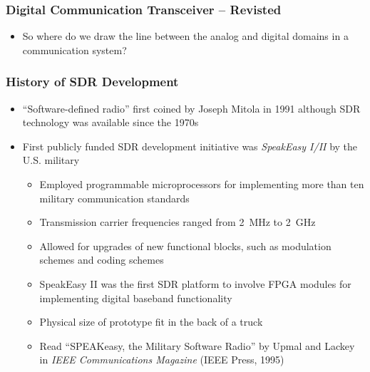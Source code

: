 \documentclass[10pt]{beamer}
\begin{document}


\frame
{
  \frametitle{Digital Communication Transceiver -- Revisted}

  \begin{itemize}
   \item So where do we draw the line between the analog and digital domains in a communication system?
  \end{itemize}

}


\frame
{
  \frametitle{History of SDR Development}
  \begin{itemize}
    \item  ``Software-defined radio'' first coined by Joseph Mitola in 1991 although SDR technology was available since the 1970s
    \item First publicly funded SDR development initiative was {\it SpeakEasy I/II} by the U.S. military
    \begin{itemize}
        \item Employed programmable microprocessors for implementing more than ten military communication standards
        \item Transmission carrier frequencies ranged from 2~MHz to 2~GHz
        \item Allowed for upgrades of new functional blocks, such as modulation schemes and coding schemes
        \item SpeakEasy II was the first SDR platform to involve FPGA modules for implementing digital baseband functionality
        \item Physical size of prototype fit in the back of a truck
        \item Read ``SPEAKeasy, the Military Software Radio'' by Upmal and Lackey in {\it IEEE Communications Magazine} (IEEE Press, 1995)
    \end{itemize}
  \end{itemize}
}


\end{document}

